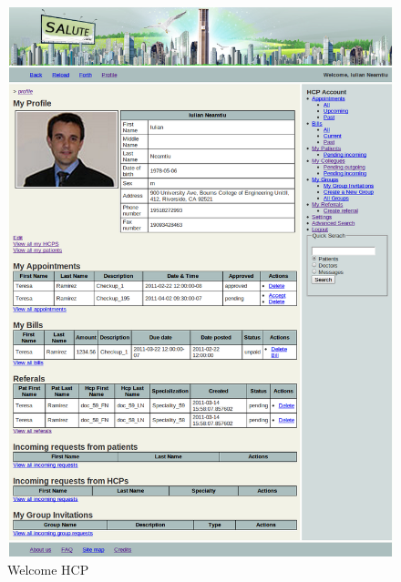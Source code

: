 \begin{figure}
\includegraphics[scale=0.5]{screenshots/doctor_profile.png}
\caption{Welcome HCP}
\end{figure}


